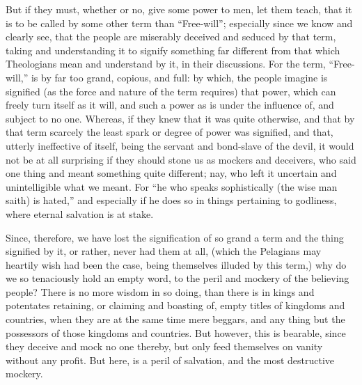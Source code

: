 But if they must, whether or no, give some power to men, let them teach, that it is to be called by some other term than “Free-will”; especially since we know and clearly see, that the people are miserably deceived and seduced by that term, taking and understanding it to signify something far different from that which Theologians mean and understand by it, in their discussions. For the term, “Free-will,” is by far too grand, copious, and full: by which, the people imagine is signified (as the force and nature of the term requires) that power, which can freely turn itself as it will, and such a power as is under the influence of, and subject to no one. Whereas, if they knew that it was quite otherwise, and that by that term scarcely the least spark or degree of power was signified, and that, utterly ineffective of itself, being the servant and bond-slave of the devil, it would not be at all surprising if they should stone us as mockers and deceivers, who said one thing and meant something quite different; nay, who left it uncertain and unintelligible what we meant. For “he who speaks sophistically (the wise man saith) is hated,” and especially if he does so in things pertaining to godliness, where eternal salvation is at stake.

Since, therefore, we have lost the signification of so grand a term and the thing signified by it, or rather, never had them at all, (which the Pelagians may heartily wish had been the case, being themselves illuded by this term,) why do we so tenaciously hold an empty word, to the peril and mockery of the believing people? There is no more wisdom in so doing, than there is in kings and potentates retaining, or claiming and boasting of, empty titles of kingdoms and countries, when they are at the same time mere beggars, and any thing but the possessors of those kingdoms and countries. But however, this is bearable, since they deceive and mock no one thereby, but only feed themselves on vanity without any profit. But here, is a peril of salvation, and the most destructive mockery.

